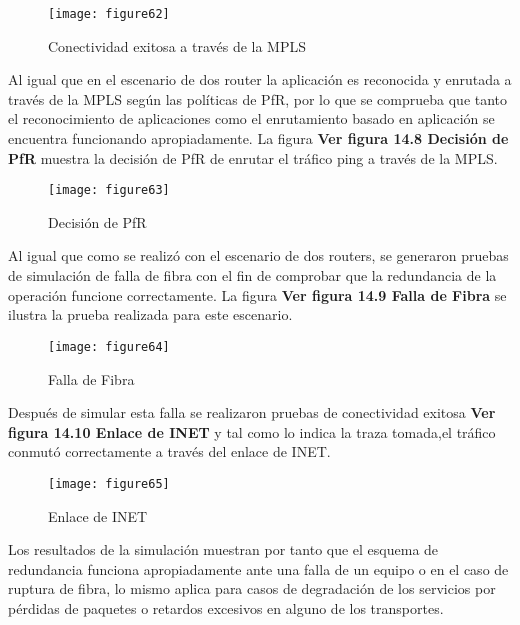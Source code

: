 \begin{figure}[htbp]
  \centering
    {\texttt{[image: figure62]}}%
  \caption{Conectividad exitosa a través de la MPLS}
  \label{fig:fig2subfig}
\end{figure}

Al igual que en el escenario de dos router la aplicación es reconocida y enrutada a través de la MPLS según las políticas de PfR, por lo que se comprueba que tanto el reconocimiento de aplicaciones como el enrutamiento basado en aplicación se encuentra funcionando apropiadamente. La figura \textbf{Ver figura 14.8 Decisión de PfR} muestra la decisión de PfR de enrutar el tráfico ping a través de la MPLS.

\begin{figure}[htbp]
  \centering
    {\texttt{[image: figure63]}}%
  \caption{Decisión de PfR}
  \label{fig:fig2subfig}
\end{figure}

Al igual que como se realizó con el escenario de dos routers, se generaron pruebas de simulación de falla de fibra con el fin de comprobar que la redundancia de la operación funcione correctamente. La figura  \textbf{Ver figura 14.9 Falla de Fibra} se ilustra la prueba realizada para este escenario.

\begin{figure}[htbp]
  \centering
    {\texttt{[image: figure64]}}%
  \caption{Falla de Fibra }
  \label{fig:fig2subfig}
\end{figure}

Después de simular esta falla se realizaron pruebas de conectividad exitosa \textbf{Ver figura 14.10 Enlace de INET}  y tal como lo indica la traza tomada,el tráfico conmutó correctamente a través del enlace de INET.


\begin{figure}[htbp]
  \centering
    {\texttt{[image: figure65]}}%
  \caption{Enlace de INET}
  \label{fig:fig2subfig}
\end{figure}

Los resultados de la simulación muestran por tanto que el esquema de redundancia funciona apropiadamente ante una falla de un equipo o en el caso de ruptura de fibra, lo mismo aplica para casos de degradación de los servicios por pérdidas de paquetes o retardos excesivos en alguno de los transportes.